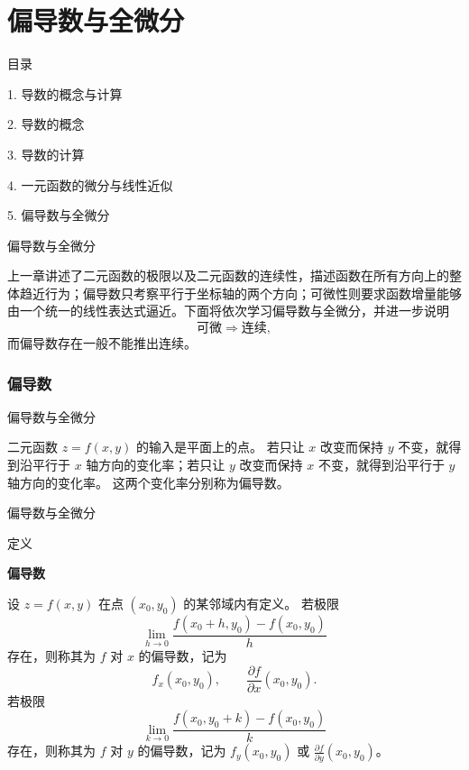 \documentclass[aspectratio=169,10pt,fontset=fandol]{ctexbeamer}
\begin{document}
\section{偏导数与全微分}
\begin{frame}[t,fragile]{目录}
\normalsize
{\color{black}\normalsize 1. 导数的概念与计算\par}\vspace{0.22em}
{\color{black}\normalsize 2. 导数的概念\par}\vspace{0.22em}
{\color{black}\normalsize 3. 导数的计算\par}\vspace{0.22em}
{\color{black}\normalsize 4. 一元函数的微分与线性近似\par}\vspace{0.22em}
{\color{blue}\normalsize 5. 偏导数与全微分\par}\vspace{0.22em}
\end{frame}
\begin{frame}[t,fragile]{偏导数与全微分}
\normalsize
{\normalsize
	
	上一章讲述了二元函数的极限以及二元函数的连续性，描述函数在所有方向上的整体趋近行为；偏导数只考察平行于坐标轴的两个方向；可微性则要求函数增量能够由一个统一的线性表达式逼近。下面将依次学习偏导数与全微分，并进一步说明
	\[
	\text{可微}\Longrightarrow\text{连续},
	\]
	而偏导数存在一般不能推出连续。


}
{\normalsize
\subsubsection*{偏导数}


}
\end{frame}
\begin{frame}[t,fragile]{偏导数与全微分}
\normalsize
{\normalsize
二元函数 $z=f(x,y)$ 的输入是平面上的点。 若只让 $x$ 改变而保持 $y$ 不变，就得到沿平行于 $x$ 轴方向的变化率；若只让 $y$ 改变而保持 $x$ 不变，就得到沿平行于 $y$ 轴方向的变化率。 这两个变化率分别称为偏导数。


}
\end{frame}
\begin{frame}[t,fragile]{偏导数与全微分}
\normalsize
\begin{block}{定义}
{\normalsize
\textbf{偏导数}\par

设 $z=f(x,y)$ 在点 $(x_0,y_0)$ 的某邻域内有定义。 若极限
\[
\lim_{h\to0}\frac{f(x_0+h,y_0)-f(x_0,y_0)}{h}
\]
存在，则称其为 $f$ 对 $x$ 的偏导数，记为
\[
f_x(x_0,y_0),\qquad \frac{\partial f}{\partial x}(x_0,y_0).
\]
若极限
\[
\lim_{k\to0}\frac{f(x_0,y_0+k)-f(x_0,y_0)}{k}
\]
存在，则称其为 $f$ 对 $y$ 的偏导数，记为 $f_y(x_0,y_0)$ 或 $\frac{\partial f}{\partial y}(x_0,y_0)$。

}
\end{block}
\end{frame}
\end{document}
